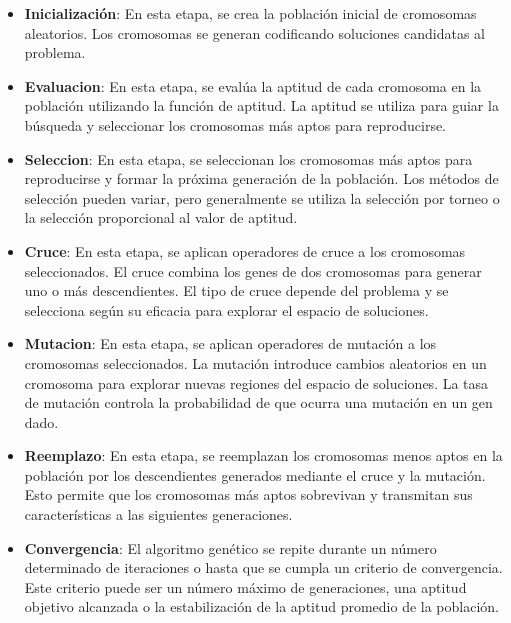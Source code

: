 \begin{itemize}

\item \textbf{Inicialización}: En esta etapa, se crea la población inicial de cromosomas aleatorios. Los cromosomas se generan codificando soluciones candidatas al problema.

\item \textbf{Evaluacion}: En esta etapa, se evalúa la aptitud de cada cromosoma en la población utilizando la función de aptitud. La aptitud se utiliza para guiar la búsqueda y seleccionar los cromosomas más aptos para reproducirse.

\item \textbf{Seleccion}: En esta etapa, se seleccionan los cromosomas más aptos para reproducirse y formar la próxima generación de la población. Los métodos de selección pueden variar, pero generalmente se utiliza la selección por torneo o la selección proporcional al valor de aptitud.

\item \textbf{Cruce}: En esta etapa, se aplican operadores de cruce a los cromosomas seleccionados. El cruce combina los genes de dos cromosomas para generar uno o más descendientes. El tipo de cruce depende del problema y se selecciona según su eficacia para explorar el espacio de soluciones.

\item \textbf{Mutacion}: En esta etapa, se aplican operadores de mutación a los cromosomas seleccionados. La mutación introduce cambios aleatorios en un cromosoma para explorar nuevas regiones del espacio de soluciones. La tasa de mutación controla la probabilidad de que ocurra una mutación en un gen dado.

\item \textbf{Reemplazo}: En esta etapa, se reemplazan los cromosomas menos aptos en la población por los descendientes generados mediante el cruce y la mutación. Esto permite que los cromosomas más aptos sobrevivan y transmitan sus características a las siguientes generaciones.

\item \textbf{Convergencia}: El algoritmo genético se repite durante un número determinado de iteraciones o hasta que se cumpla un criterio de convergencia. Este criterio puede ser un número máximo de generaciones, una aptitud objetivo alcanzada o la estabilización de la aptitud promedio de la población.
\end{itemize}

